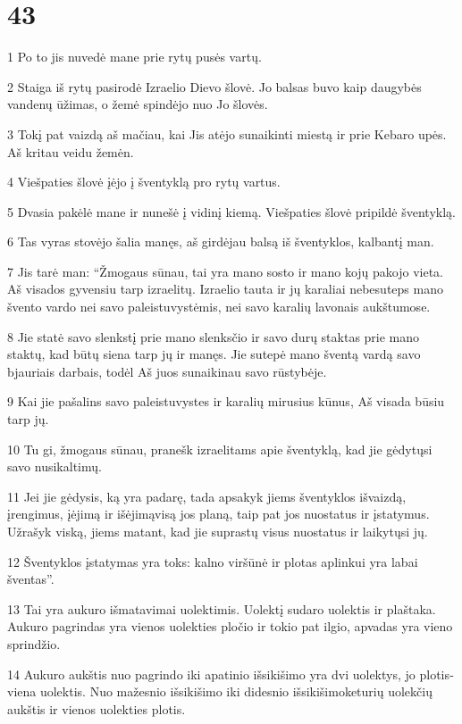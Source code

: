 \chapter{43}


\par 1 Po to jis nuvedė mane prie rytų pusės vartų. 
\par 2 Staiga iš rytų pasirodė Izraelio Dievo šlovė. Jo balsas buvo kaip daugybės vandenų ūžimas, o žemė spindėjo nuo Jo šlovės. 
\par 3 Tokį pat vaizdą aš mačiau, kai Jis atėjo sunaikinti miestą ir prie Kebaro upės. Aš kritau veidu žemėn. 
\par 4 Viešpaties šlovė įėjo į šventyklą pro rytų vartus. 
\par 5 Dvasia pakėlė mane ir nunešė į vidinį kiemą. Viešpaties šlovė pripildė šventyklą. 
\par 6 Tas vyras stovėjo šalia manęs, aš girdėjau balsą iš šventyklos, kalbantį man. 
\par 7 Jis tarė man: “Žmogaus sūnau, tai yra mano sosto ir mano kojų pakojo vieta. Aš visados gyvensiu tarp izraelitų. Izraelio tauta ir jų karaliai nebesuteps mano švento vardo nei savo paleistuvystėmis, nei savo karalių lavonais aukštumose. 
\par 8 Jie statė savo slenkstį prie mano slenksčio ir savo durų staktas prie mano staktų, kad būtų siena tarp jų ir manęs. Jie sutepė mano šventą vardą savo bjauriais darbais, todėl Aš juos sunaikinau savo rūstybėje. 
\par 9 Kai jie pašalins savo paleistuvystes ir karalių mirusius kūnus, Aš visada būsiu tarp jų. 
\par 10 Tu gi, žmogaus sūnau, pranešk izraelitams apie šventyklą, kad jie gėdytųsi savo nusikaltimų. 
\par 11 Jei jie gėdysis, ką yra padarę, tada apsakyk jiems šventyklos išvaizdą, įrengimus, įėjimą ir išėjimą­visą jos planą, taip pat jos nuostatus ir įstatymus. Užrašyk viską, jiems matant, kad jie suprastų visus nuostatus ir laikytųsi jų. 
\par 12 Šventyklos įstatymas yra toks: kalno viršūnė ir plotas aplinkui yra labai šventas”. 
\par 13 Tai yra aukuro išmatavimai uolektimis. Uolektį sudaro uolektis ir plaštaka. Aukuro pagrindas yra vienos uolekties pločio ir tokio pat ilgio, apvadas yra vieno sprindžio. 
\par 14 Aukuro aukštis nuo pagrindo iki apatinio išsikišimo yra dvi uolektys, jo plotis­viena uolektis. Nuo mažesnio išsikišimo iki didesnio išsikišimo­keturių uolekčių aukštis ir vienos uolekties plotis. 
